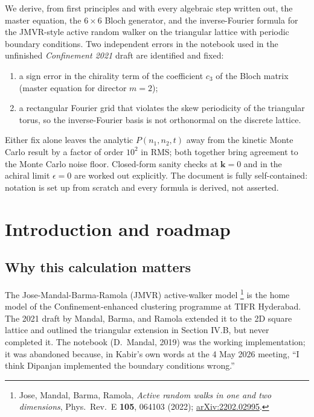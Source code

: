 \documentclass[11pt,a4paper]{article}
\newcommand{\vk}{\mathbf{k}}
\begin{document}
\begin{center}
\begin{tcolorbox}[enhanced, sharp corners, width=0.88\linewidth, colback=keyfill,
  colframe=accent, boxrule=0pt, leftrule=3pt, fonttitle=\bfseries\color{accent},
  title=Abstract]
\small
We derive, from first principles and with every algebraic step written out,
the master equation, the $6\times 6$ Bloch generator, and the
inverse-Fourier formula for the JMVR-style active random walker on the
triangular lattice with periodic boundary conditions. Two independent
errors in the {} notebook used in the unfinished
\emph{Confinement 2021} draft are identified and fixed:
\begin{enumerate}[label=(\roman*),leftmargin=*,itemsep=0pt]
\item a sign error in the chirality term of the coefficient $c_3$ of the
  Bloch matrix (master equation for director $m=2$);
\item a rectangular Fourier grid that violates the skew periodicity of the
  triangular torus, so the inverse-Fourier basis is not orthonormal on the
  discrete lattice.
\end{enumerate}
Either fix alone leaves the analytic $P(n_1, n_2, t)$ away from the
kinetic Monte Carlo result by a factor of order $10^2$ in RMS; both together
bring agreement to the Monte Carlo noise floor. Closed-form sanity checks
at $\vk = 0$ and in the achiral limit $\epsilon = 0$ are worked out
explicitly. The document is fully self-contained: notation is set up from
scratch and every formula is derived, not asserted.
\end{tcolorbox}
\end{center}
\vfill
{}
\newpage
\setcounter{page}{1}

\tableofcontents
\vspace{1cm}

\section{Introduction and roadmap}\label{sec:intro}

\subsection{Why this calculation matters}\label{ssec:why}

The Jose-Mandal-Barma-Ramola (JMVR) active-walker model%
\footnote{Jose, Mandal, Barma, Ramola, \emph{Active random walks in one
and two dimensions}, Phys.\ Rev.\ E \textbf{105}, 064103 (2022);
\href{https://arxiv.org/abs/2202.02995}{arXiv:2202.02995}.} is the home
model of the Confinement-enhanced clustering programme at TIFR Hyderabad. The 2021 draft by Mandal, Barma,
and Ramola extended it to the 2D square lattice and outlined the
triangular extension in Section IV.B, but never completed it. The
notebook {} (D.~Mandal, 2019) was the working
implementation; it was abandoned because, in Kabir's own words at the 4
May 2026 meeting, ``I think Dipanjan implemented the boundary conditions
wrong.''
\end{document}

